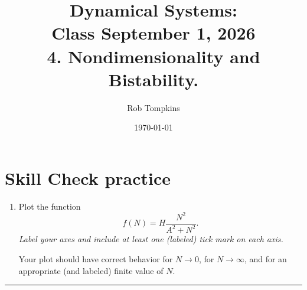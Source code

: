 \documentclass[12pt]{amsart}
\title{Dynamical Systems:\\Class September 1, 2026\\ 4. Nondimensionality and Bistability.}
\author{Rob Tompkins}
\date{\today}
\theoremstyle{conjecture}
\theoremstyle{definition}
\theoremstyle{question}
\theoremstyle{theorem}
\newcommand{\sectionrule}{%
    \vspace{0.3em}
    \hrule
    \vspace{0.8em}
}
\begin{document}
    \maketitle

    \section*{Skill Check practice}
    \begin{enumerate}
        \item Plot the function
        \[
            f(N)=H\frac{N^2}{A^2+N^2}.
        \]
        \emph{Label your axes and include at least one (labeled) tick mark on each axis.}

        Your plot should have correct behavior for $N\to0$, for $N\to\infty$, and for an appropriate
        (and labeled) finite value of $N$.
    \end{enumerate}

    \sectionrule
\end{document}

